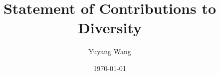 



\title{Statement of Contributions to Diversity}
\def\rsCustom{}

\author{Yuyang Wang}
\date{\today}
\makeatletter
\fancyfoot[L]{\scshape \MakeLowercase{\@author}}
\fancyfoot[R]{{\scshape \MakeLowercase{\@title}}\quad{\LARGE\sfrac{\thepage}{\pageref*{LastPage}}}}
\makeatother



\maketitle%
\thispagestyle{fancy}


\rsCustom{}


\footnotesize


